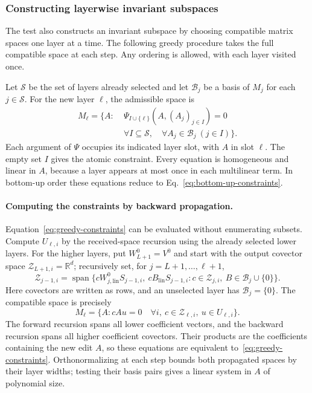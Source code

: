 \documentclass[twoside]{article}
\theoremstyle{remark}
\DeclareMathOperator{\spanop}{span}
\newcommand{\R}{\mathbb R}
\theoremstyle{highlightdefinition}
\theoremstyle{remark}
\newcommand{\spn}{\spanop}
\begin{document}
\subsubsection{Constructing layerwise invariant subspaces}
The test also constructs an invariant subspace by choosing compatible matrix spaces one layer at a time. The following greedy procedure takes the full compatible space at each step. Any ordering is allowed, with each layer visited once.

Let $\mathcal S$ be the set of layers already selected and let $\mathcal B_j$ be a basis of $M_j$ for each $j\in\mathcal S$. For the new layer $\ell$, the admissible space is
\begin{equation}
\begin{split}
 M_\ell=\{A:\;&\Psi_{I\cup\{\ell\}}(A,(A_j)_{j\in I})=0\\
 &\forall I\subseteq\mathcal S,\quad
   \forall A_j\in\mathcal B_j\ (j\in I)\}.
\end{split}\label{eq:greedy-constraints}
\end{equation}
Each argument of $\Psi$ occupies its indicated layer slot, with $A$ in slot $\ell$. The empty set $I$ gives the atomic constraint. Every equation is homogeneous and linear in $A$, because a layer appears at most once in each multilinear term. In bottom-up order these equations reduce to Eq.~\eqref{eq:bottom-up-constraints}.


\paragraph{Computing the constraints by backward propagation.}
Equation~\eqref{eq:greedy-constraints} can be evaluated without enumerating subsets. Compute $U_{\ell,i}$ by the received-space recursion using the already selected lower layers. For the higher layers, put $W_{L+1}^0=V^0$ and start with the output covector space $\mathcal Z_{L+1,i}=\R^d$; recursively set, for $j=L+1,\ldots,\ell+1$,
\begin{equation}
 \mathcal Z_{j-1,i}
 =\spn\{cW_{j,\mathrm{lin}}^0S_{j-1,i},\ cB_{\mathrm{lin}}S_{j-1,i}:
 c\in\mathcal Z_{j,i},\ B\in\mathcal B_j\cup\{0\}\}.
 \label{eq:app-backward-constraints}
\end{equation}
Here covectors are written as rows, and an unselected layer has $\mathcal B_j=\{0\}$. The compatible space is precisely
\[
 M_\ell=\{A:cAu=0\quad\forall i,\ c\in\mathcal Z_{\ell,i},\ u\in U_{\ell,i}\}.
\]
The forward recursion spans all lower coefficient vectors, and the backward recursion spans all higher coefficient covectors. Their products are the coefficients containing the new edit $A$, so these equations are equivalent to~\eqref{eq:greedy-constraints}. Orthonormalizing at each step bounds both propagated spaces by their layer widths; testing their basis pairs gives a linear system in $A$ of polynomial size.
\end{document}
